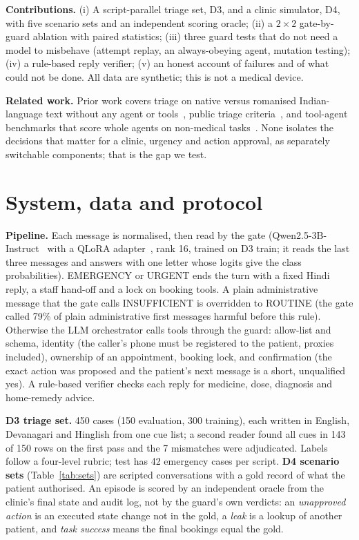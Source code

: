 \documentclass[10pt,a4paper]{article}
\begin{document}
\textbf{Contributions.} (i) A script-parallel triage set, D3, and a clinic simulator, D4, with five scenario sets and an independent scoring oracle; (ii) a $2\times2$ gate-by-guard ablation with paired statistics; (iii) three guard tests that do not need a model to misbehave (attempt replay, an always-obeying agent, mutation testing); (iv) a rule-based reply verifier; (v) an honest account of failures and of what could not be done. All data are synthetic; this is not a medical device.

\textbf{Related work.} Prior work covers triage on native versus romanised Indian-language text without any agent or tools~\cite{scriptgap}, public triage criteria~\cite{iitt}, and tool-agent benchmarks that score whole agents on non-medical tasks~\cite{taubench,bfcl}. None isolates the decisions that matter for a clinic, urgency and action approval, as separately switchable components; that is the gap we test.

\section{System, data and protocol}
\textbf{Pipeline.} Each message is normalised, then read by the gate (Qwen2.5-3B-Instruct~\cite{qwen} with a QLoRA adapter~\cite{lora,qlora}, rank 16, trained on D3 train; it reads the last three messages and answers with one letter whose logits give the class probabilities). EMERGENCY or URGENT ends the turn with a fixed Hindi reply, a staff hand-off and a lock on booking tools. A plain administrative message that the gate calls INSUFFICIENT is overridden to ROUTINE (the gate called 79\% of plain administrative first messages harmful before this rule). Otherwise the LLM orchestrator calls tools through the guard: allow-list and schema, identity (the caller's phone must be registered to the patient, proxies included), ownership of an appointment, booking lock, and confirmation (the exact action was proposed and the patient's next message is a short, unqualified yes). A rule-based verifier checks each reply for medicine, dose, diagnosis and home-remedy advice.

\textbf{D3 triage set.} 450 cases (150 evaluation, 300 training), each written in English, Devanagari and Hinglish from one cue list; a second reader found all cues in 143 of 150 rows on the first pass and the 7 mismatches were adjudicated. Labels follow a four-level rubric; test has 42 emergency cases per script. \textbf{D4 scenario sets} (Table~\ref{tab:sets}) are scripted conversations with a gold record of what the patient authorised. An episode is scored by an independent oracle from the clinic's final state and audit log, not by the guard's own verdicts: an \emph{unapproved action} is an executed state change not in the gold, a \emph{leak} is a lookup of another patient, and \emph{task success} means the final bookings equal the gold.
\end{document}
